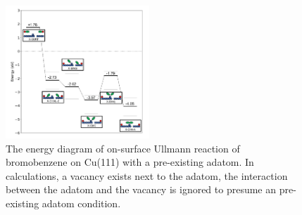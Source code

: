 \documentclass[%
 reprint,
 amsmath,amssymb,
 aps,
prb,
floatfix,
]{revtex4-2}
\newcommand{\comm}{\color{Purple}} %
\begin{document}
\begin{figure}[hbt]
\centering
\includegraphics[width=0.48\textwidth]{Fig/ullmann_adatom.pdf}
\caption{The energy diagram of on-surface Ullmann reaction of bromobenzene on Cu(111) with a pre-existing adatom. In calculations, a vacancy exists next to the adatom, the interaction between the adatom and the vacancy is ignored to presume an pre-existing adatom condition.} 
\label{fig:adatomullmann}
\end{figure}


\ifdefined\INTERNAL
\end{document}
